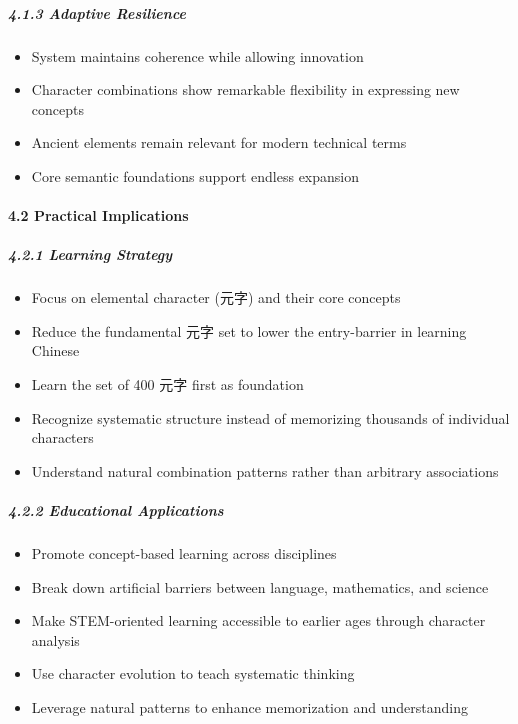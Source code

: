 \documentclass[
  11pt,
  letterpaper,
]{article}
\providecommand{\tightlist}{%
  \setlength{\itemsep}{0pt}\setlength{\parskip}{0pt}}
\begin{document}
\subparagraph{4.1.3 Adaptive Resilience}\label{adaptive-resilience}

\begin{itemize}
\tightlist
\item
  System maintains coherence while allowing innovation
\item
  Character combinations show remarkable flexibility in expressing new
  concepts
\item
  Ancient elements remain relevant for modern technical terms
\item
  Core semantic foundations support endless expansion
\end{itemize}

\paragraph{4.2 Practical Implications}\label{practical-implications}

\subparagraph{4.2.1 Learning Strategy}\label{learning-strategy}

\begin{itemize}
\tightlist
\item
  Focus on elemental character (元字) and their core concepts
\item
  Reduce the fundamental 元字 set to lower the entry-barrier in learning
  Chinese
\item
  Learn the set of 400 元字 first as foundation
\item
  Recognize systematic structure instead of memorizing thousands of
  individual characters
\item
  Understand natural combination patterns rather than arbitrary
  associations
\end{itemize}

\subparagraph{4.2.2 Educational
Applications}\label{educational-applications}

\begin{itemize}
\tightlist
\item
  Promote concept-based learning across disciplines
\item
  Break down artificial barriers between language, mathematics, and
  science
\item
  Make STEM-oriented learning accessible to earlier ages through
  character analysis
\item
  Use character evolution to teach systematic thinking
\item
  Leverage natural patterns to enhance memorization and understanding
\end{itemize}
\end{document}
